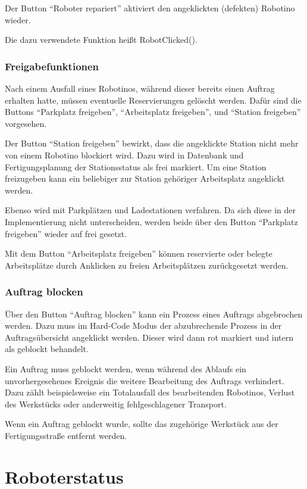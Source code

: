 Der Button "`Roboter repariert"' aktiviert den angeklickten (defekten) Robotino wieder. 

Die dazu verwendete Funktion heißt RobotClicked().

\subsubsection{Freigabefunktionen}

Nach einem Ausfall eines Robotinos, während dieser bereits einen Auftrag erhalten hatte, müssen eventuelle Reservierungen gelöscht werden. Dafür sind die Buttons "`Parkplatz freigeben"', "`Arbeitsplatz freigeben"', und "`Station freigeben"' vorgesehen.

Der Button "`Station freigeben"' bewirkt, dass die angeklickte Station nicht mehr von einem Robotino blockiert wird. Dazu wird in Datenbank und Fertigungsplanung der Stationsstatus als frei markiert. Um eine Station freizugeben kann ein beliebiger zur Station gehöriger Arbeitsplatz angeklickt werden.

Ebenso wird mit Parkplätzen und Ladestationen verfahren. Da sich diese in der Implementierung nicht unterscheiden, werden beide über den Button "`Parkplatz freigeben"' wieder auf frei gesetzt. 

Mit dem Button "`Arbeitsplatz freigeben"' können reservierte oder belegte Arbeitsplätze durch Anklicken zu freien Arbeitsplätzen zurückgesetzt werden. 

\subsubsection{Auftrag blocken}

Über den Button "`Auftrag blocken"' kann ein Prozess eines Auftrags abgebrochen werden. Dazu muss im Hard-Code Modus der abzubrechende Prozess in der Auftragsübersicht angeklickt werden. Dieser wird dann rot markiert und intern als geblockt behandelt. 

Ein Auftrag muss geblockt werden, wenn während des Ablaufs ein unvorhergesehenes Ereignis die weitere Bearbeitung des Auftrags verhindert. Dazu zählt beispielsweise ein Totalausfall des bearbeitenden Robotinos, Verlust des Werkstücks oder anderweitig fehlgeschlagener Transport. 

Wenn ein Auftrag geblockt wurde, sollte das zugehörige Werkstück aus der Fertigungsstraße entfernt werden. 

\section{Roboterstatus}

